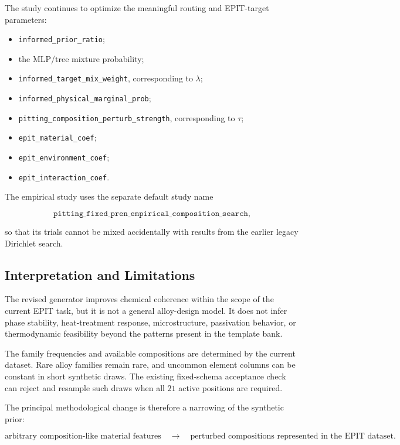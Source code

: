 \documentclass{article}
\begin{document}
The study continues to optimize the meaningful routing and EPIT-target
parameters:

\begin{itemize}
    \item \texttt{informed\_prior\_ratio};
    \item the MLP/tree mixture probability;
    \item \texttt{informed\_target\_mix\_weight}, corresponding to \(\lambda\);
    \item \texttt{informed\_physical\_marginal\_prob};
    \item \texttt{pitting\_composition\_perturb\_strength}, corresponding to
    \(\tau\);
    \item \texttt{epit\_material\_coef};
    \item \texttt{epit\_environment\_coef};
    \item \texttt{epit\_interaction\_coef}.
\end{itemize}

The empirical study uses the separate default study name

\[
\texttt{pitting\_fixed\_pren\_empirical\_composition\_search},
\]

so that its trials cannot be mixed accidentally with results from the earlier
legacy Dirichlet search.

\subsection{Interpretation and Limitations}

The revised generator improves chemical coherence within the scope of the
current EPIT task, but it is not a general alloy-design model. It does not infer
phase stability, heat-treatment response, microstructure, passivation behavior,
or thermodynamic feasibility beyond the patterns present in the template bank.

The family frequencies and available compositions are determined by the current
dataset. Rare alloy families remain rare, and uncommon element columns can be
constant in short synthetic draws. The existing fixed-schema acceptance check
can reject and resample such draws when all \(21\) active positions are required.

The principal methodological change is therefore a narrowing of the synthetic
prior:

\[
\text{arbitrary composition-like material features}
\quad\longrightarrow\quad
\text{perturbed compositions represented in the EPIT dataset}.
\]
\end{document}
